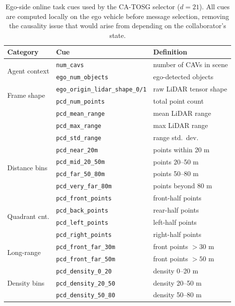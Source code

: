 \documentclass[journal]{IEEEtran}
\newcommand{\method}{CA-TOSG}
\begin{document}
\begin{table}[t]
\centering
\footnotesize
\setlength{\tabcolsep}{3pt}
\caption{Ego-side online task cues used by the \method{} selector ($d=21$). All cues are computed locally on the ego vehicle before message selection, removing the causality issue that would arise from depending on the collaborator's state.}
\label{tab:cues}
\begin{tabular}{lll}
\toprule
Category & Cue & Definition \\
\midrule
\multirow{2}{*}{Agent context} & \texttt{num\_cavs} & number of CAVs in scene \\
                               & \texttt{ego\_num\_objects} & ego-detected objects \\
\midrule
\multirow{2}{*}{Frame shape}   & \texttt{ego\_origin\_lidar\_shape\_0/1} & raw LiDAR tensor shape \\
\midrule
\multirow{4}{*}{Range stats}   & \texttt{pcd\_num\_points} & total point count \\
                               & \texttt{pcd\_mean\_range}    & mean LiDAR range \\
                               & \texttt{pcd\_max\_range}     & max LiDAR range \\
                               & \texttt{pcd\_std\_range}     & range std.\ dev. \\
\midrule
\multirow{4}{*}{Distance bins} & \texttt{pcd\_near\_20m}      & points within 20 m \\
                               & \texttt{pcd\_mid\_20\_50m}   & points 20--50 m \\
                               & \texttt{pcd\_far\_50\_80m}   & points 50--80 m \\
                               & \texttt{pcd\_very\_far\_80m} & points beyond 80 m \\
\midrule
\multirow{4}{*}{Quadrant cnt.} & \texttt{pcd\_front\_points}  & front-half points \\
                               & \texttt{pcd\_back\_points}   & rear-half points \\
                               & \texttt{pcd\_left\_points}   & left-half points \\
                               & \texttt{pcd\_right\_points}  & right-half points \\
\midrule
\multirow{2}{*}{Long-range}    & \texttt{pcd\_front\_far\_30m} & front points $>30$ m \\
                               & \texttt{pcd\_front\_far\_50m} & front points $>50$ m \\
\midrule
\multirow{3}{*}{Density bins}  & \texttt{pcd\_density\_0\_20}    & density 0--20 m \\
                               & \texttt{pcd\_density\_20\_50}   & density 20--50 m \\
                               & \texttt{pcd\_density\_50\_80}   & density 50--80 m \\
\bottomrule
\end{tabular}
\end{table}
\end{document}
